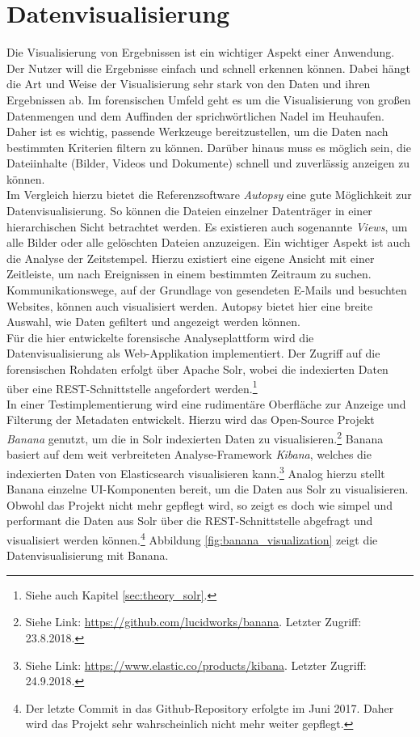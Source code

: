 \chapter{Datenvisualisierung}
\label{ch:data_visualization}

Die Visualisierung von Ergebnissen ist ein wichtiger Aspekt einer Anwendung. Der Nutzer will die Ergebnisse einfach und schnell erkennen können. Dabei hängt die Art und Weise der Visualisierung sehr stark von den Daten und ihren Ergebnissen ab. Im forensischen Umfeld geht es um die Visualisierung von großen Datenmengen und dem Auffinden der sprichwörtlichen Nadel im Heuhaufen. Daher ist es wichtig, passende Werkzeuge bereitzustellen, um die Daten nach bestimmten Kriterien filtern zu können. Darüber hinaus muss es möglich sein, die Dateiinhalte (Bilder, Videos und  Dokumente) schnell und zuverlässig anzeigen zu können.\\

\noindent
Im Vergleich hierzu bietet die Referenzsoftware \textit{Autopsy} eine gute Möglichkeit zur Datenvisualisierung. So können die Dateien einzelner Datenträger in einer hierarchischen Sicht betrachtet werden. Es existieren auch sogenannte \textit{Views}, um alle Bilder oder alle gelöschten Dateien anzuzeigen. Ein wichtiger Aspekt ist auch die Analyse der Zeitstempel. Hierzu existiert eine eigene Ansicht mit einer Zeitleiste, um nach Ereignissen in einem bestimmten Zeitraum zu suchen. Kommunikationswege, auf der Grundlage von gesendeten E-Mails und besuchten Websites, können auch visualisiert werden. Autopsy bietet hier eine breite Auswahl, wie Daten gefiltert und angezeigt werden können.\\

\noindent
Für die hier entwickelte forensische Analyseplattform wird die Datenvisualisierung als Web-Applikation implementiert. Der Zugriff auf die forensischen Rohdaten erfolgt über Apache Solr, wobei die indexierten Daten über eine REST-Schnittstelle angefordert werden.\footnote{Siehe auch Kapitel \ref{sec:theory_solr}.}\\

\noindent
In einer Testimplementierung wird eine rudimentäre Oberfläche zur Anzeige und Filterung der Metadaten entwickelt. Hierzu wird das Open-Source Projekt \textit{Banana} genutzt, um die in Solr indexierten Daten zu visualisieren.\footnote{Siehe Link: \url{https://github.com/lucidworks/banana}. Letzter Zugriff: 23.8.2018.} Banana basiert auf dem weit verbreiteten Analyse-Framework \textit{Kibana}, welches die indexierten Daten von Elasticsearch visualisieren kann.\footnote{Siehe Link: \url{https://www.elastic.co/products/kibana}. Letzter Zugriff: 24.9.2018.} Analog hierzu stellt Banana einzelne UI-Komponenten bereit, um die Daten aus Solr zu visualisieren. Obwohl das Projekt nicht mehr gepflegt wird, so zeigt es doch wie simpel und performant die Daten aus Solr über die REST-Schnittstelle abgefragt und visualisiert werden können.\footnote{Der letzte Commit in das Github-Repository erfolgte im Juni 2017. Daher wird das Projekt sehr wahrscheinlich nicht mehr weiter gepflegt.}
Abbildung \ref{fig:banana_visualization} zeigt die Datenvisualisierung mit Banana.

